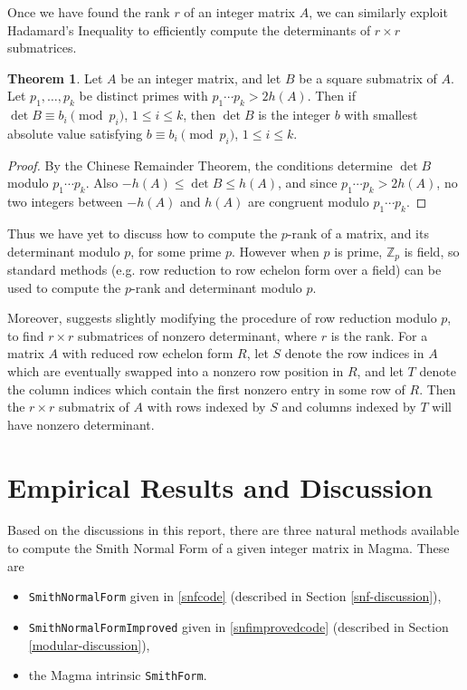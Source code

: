 \documentclass[12pt,a4paper,answers]{exam}
\newcommand{\Z}{\mathbb{Z}}
\theoremstyle{definition}
\newtheorem{theorem}{Theorem}[section]
\begin{document}
Once we have found the rank $r$ of an integer matrix $A$, we can similarly exploit Hadamard's Inequality to efficiently compute the determinants of $r\times r$ submatrices.

\begin{theorem}
  Let $A$ be an integer matrix, and let $B$ be a square submatrix of $A$. Let $p_1,\ldots,p_k$ be distinct primes with $p_1\cdots p_k>2h(A)$. Then if $\det B\equiv b_i\pmod{p_i}$, $1\leq i\leq k$, then $\det B$ is the integer $b$ with smallest absolute value satisfying $b\equiv b_i\pmod{p_i}$, $1\leq i\leq k$.
\end{theorem}

\begin{proof}
  By the Chinese Remainder Theorem, the conditions determine $\det B$ modulo $p_1\cdots p_k$. Also $-h(A)\leq\det B\leq h(A)$, and since $p_1\cdots p_k>2h(A)$, no two integers between $-h(A)$ and $h(A)$ are congruent modulo $p_1\cdots p_k$. 
\end{proof}

Thus we have yet to discuss how to compute the $p$-rank of a matrix, and its determinant modulo $p$, for some prime $p$. However when $p$ is prime, $\Z_p$ is field, so standard methods (e.g. row reduction to row echelon form over a field) can be used to compute the $p$-rank and determinant modulo $p$.

Moreover, \cite{sims} suggests slightly modifying the procedure of row reduction modulo $p$, to find $r\times r$ submatrices of nonzero determinant, where $r$ is the rank. For a matrix $A$ with reduced row echelon form $R$, let $S$ denote the row indices in $A$ which are eventually swapped into a nonzero row position in $R$, and let $T$ denote the column indices which contain the first nonzero entry in some row of $R$. Then the $r\times r$ submatrix of $A$ with rows indexed by $S$ and columns indexed by $T$ will have nonzero determinant.

\section{Empirical Results and Discussion}
\label{conclusion}

Based on the discussions in this report, there are three natural methods available to compute the Smith Normal Form of a given integer matrix in {\sc Magma}. These are
\begin{itemize}
\item \texttt{SmithNormalForm} given in \autoref{snfcode} (described in Section \ref{snf-discussion}), \item \texttt{SmithNormalFormImproved} given in \autoref{snfimprovedcode} (described in Section \ref{modular-discussion}),
\item the {\sc Magma} intrinsic \texttt{SmithForm}.
\end{itemize}
\end{document}
